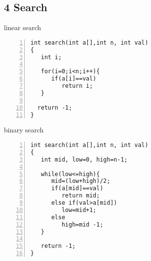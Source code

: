 \documentclass{beamer}
\begin{document}
\subsection*{4 Search}
\begin{frame}[fragile]{linear search}
\begin{lstlisting}[numbers=left]
int search(int a[],int n, int val)
{
   int i;

   for(i=0;i<n;i++){
      if(a[i]==val)
         return i;
   }

  return -1;
}
\end{lstlisting}
\end{frame}

\begin{frame}[fragile]{binary search}
\begin{lstlisting}[numbers=left] 
int search(int a[],int n, int val)
{
   int mid, low=0, high=n-1;

   while(low<=high){
      mid=(low+high)/2;
      if(a[mid]==val)
         return mid;
      else if(val>a[mid])
         low=mid+1;
      else
         high=mid -1;
   }

   return -1;
}
\end{lstlisting}
\end{frame}
\end{document}
